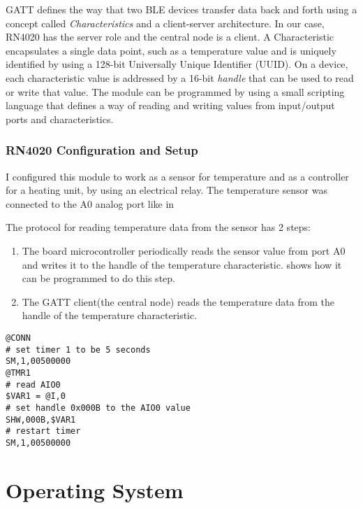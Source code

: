 GATT defines the way that two BLE devices transfer data back and forth using a concept called \textit{Characteristics} and a client-server architecture. In our case, RN4020 has the server role and the central node is a client. A Characteristic encapsulates a single data point, such as a temperature value and is uniquely identified by using a 128-bit Universally Unique Identifier (UUID). On a device, each characteristic value is addressed by a 16-bit \textit{handle} that can be used to read or write that value. The module can be programmed by using a small scripting language that defines a way of reading and writing values from input/output ports and characteristics.

\subsubsection{RN4020 Configuration and Setup}

I configured this module to work as a sensor for temperature and as a controller for a heating unit, by using an electrical relay. The temperature sensor was connected to the A0 analog port like in 

The protocol for reading temperature data from the sensor has 2 steps:
\begin{enumerate}
  \item The board microcontroller periodically reads the sensor value from port A0 and writes it to the handle of the temperature characteristic.  shows how it can be programmed to do this step.
  \item The GATT client(the central node) reads the temperature data from the handle of the temperature characteristic.
\end{enumerate}

\lstset{caption=Script for programming the RN4020 module to provide temperature data, label=lst:rn4020-script}
\begin{lstlisting}
@CONN
# set timer 1 to be 5 seconds
SM,1,00500000
@TMR1
# read AIO0
$VAR1 = @I,0
# set handle 0x000B to the AIO0 value
SHW,000B,$VAR1
# restart timer
SM,1,00500000
\end{lstlisting}

\section{Operating System}


